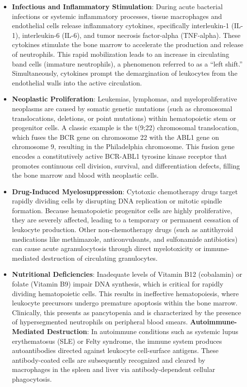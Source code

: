 \begin{itemize}
  \item \textbf{Infectious and Inflammatory Stimulation}: During acute bacterial infections or systemic inflammatory processes, tissue macrophages and endothelial cells release inflammatory cytokines, specifically interleukin-1 (IL-1), interleukin-6 (IL-6), and tumor necrosis factor-alpha (TNF-alpha). These cytokines stimulate the bone marrow to accelerate the production and release of neutrophils. This rapid mobilization leads to an increase in circulating band cells (immature neutrophils), a phenomenon referred to as a ``left shift.'' Simultaneously, cytokines prompt the demargination of leukocytes from the endothelial walls into the active circulation.
  \item \textbf{Neoplastic Proliferation}: Leukemias, lymphomas, and myeloproliferative neoplasms are caused by somatic genetic mutations (such as chromosomal translocations, deletions, or point mutations) within hematopoietic stem or progenitor cells. A classic example is the t(9;22) chromosomal translocation, which fuses the BCR gene on chromosome 22 with the ABL1 gene on chromosome 9, resulting in the Philadelphia chromosome. This fusion gene encodes a constitutively active BCR-ABL1 tyrosine kinase receptor that promotes continuous cell division, survival, and differentiation defects, filling the bone marrow and blood with neoplastic cells.
  \item \textbf{Drug-Induced Myelosuppression}: Cytotoxic chemotherapy drugs target rapidly dividing cells by disrupting DNA replication or mitotic spindle formation. Because hematopoietic progenitor cells are highly proliferative, they are severely affected, leading to a temporary or permanent cessation of leukocyte production. Other non-chemotherapy drugs (such as antithyroid medications like methimazole, anticonvulsants, and sulfonamide antibiotics) can cause acute agranulocytosis through direct myelotoxicity or immune-mediated destruction of circulating granulocytes.
  \item \textbf{Nutritional Deficiencies}: Inadequate levels of Vitamin B12 (cobalamin) or folate (Vitamin B9) impair DNA synthesis, which is critical for rapidly dividing hematopoietic cells. This results in ineffective hematopoiesis, where leukocyte precursors undergo premature apoptosis within the bone marrow. Clinically, this presents as pancytopenia and is characterized by the presence of hypersegmented neutrophils on peripheral blood smears.
  \textbf{Autoimmune-Mediated Destruction}: In autoimmune conditions such as systemic lupus erythematosus (SLE) or Felty syndrome, the immune system produces autoantibodies directed against leukocyte cell-surface antigens. These antibody-coated cells are subsequently recognized and cleared by macrophages in the spleen and liver via antibody-dependent cellular phagocytosis.

\end{itemize}
